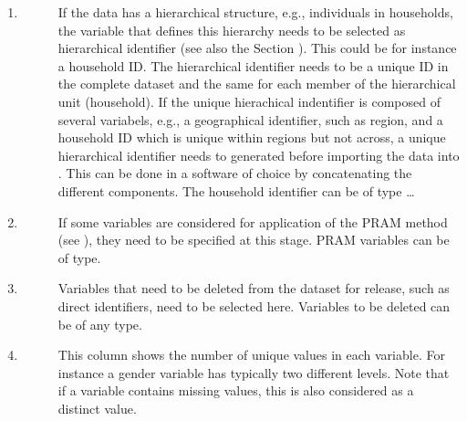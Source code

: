 \documentclass[letterpaper,10pt,english]{sphinxmanual}
\begin{document}
\begin{enumerate}
\begin{description}
\end{description}

\item {} \begin{description}
\item[{}] \leavevmode
If the data has a hierarchical structure, e.g., individuals
in households, the variable that defines this hierarchy needs to be selected as
hierarchical identifier (see also the Section ). This could be for instance a household ID. The hierarchical
identifier needs to be a unique ID in the complete dataset and the same for each
member of the hierarchical unit (household). If the unique hierachical indentifier is
composed of several variabels, e.g., a geographical identifier, such as region, and
a household ID which is unique within regions but not across, a unique hierarchical
identifier needs to generated before importing the data into . This can be done in
a software of choice by concatenating the different components.
The household identifier can be of type …

\end{description}

\item {} \begin{description}
\item[{}] \leavevmode
If some variables are considered for application of the PRAM method (see ),
they need to be specified at this stage. PRAM variables can be of type.

\end{description}

\item {} \begin{description}
\item[{}] \leavevmode
Variables that need to be deleted from the dataset for release, such as
direct identifiers, need to be selected here. Variables to be deleted can be of any type.

\end{description}

\item {} \begin{description}
\item[{}] \leavevmode
This column shows the number of unique values in each variable. For instance a gender
variable has typically two different levels. Note that if a variable contains missing
values, this is also considered as a distinct value.


\end{description}
\end{enumerate}
\end{document}
